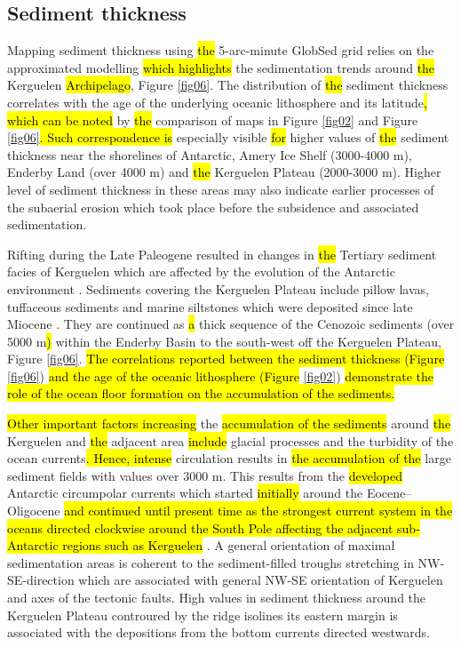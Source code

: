 \documentclass[geomatics,article,submit,pdftex,moreauthors]{Definitions/mdpi}
\begin{document}
\subsection{Sediment thickness}

Mapping sediment thickness using \hl{the }5-arc-minute GlobSed grid relies on the approximated modelling \hl{which highlights} the sedimentation trends around \hl{the }Kerguelen \hl{Archipelago}, Figure \ref{fig06}. The distribution of \hl{the }sediment thickness correlates with the age of the underlying oceanic lithosphere and its latitude\hl{, which can be noted} by \hl{the }comparison of maps in Figure \ref{fig02} and Figure \ref{fig06}\hl{. Such correspondence is }especially visible \hl{for} higher values of \hl{the }sediment thickness near the shorelines of Antarctic, Amery Ice Shelf (3000-4000 m), Enderby Land (over 4000 m) and \hl{the }Kerguelen Plateau (2000-3000 m). Higher level of sediment thickness in these areas may also indicate earlier processes of the subaerial erosion which took place before the subsidence and associated sedimentation. 

Rifting during the Late Paleogene resulted in changes in \hl{the }Tertiary sediment facies of Kerguelen which are affected by the evolution of the Antarctic environment \cite{Froehlich}. Sediments covering the Kerguelen Plateau include pillow lavas, tuffaceous sediments and marine siltstones which were deposited since late Miocene \cite{Duncan}. They are continued as \hl{a} thick sequence of the Cenozoic sediments (over 5000 m\hl{)} within the Enderby Basin to the south-west off the Kerguelen Plateau, Figure \ref{fig06}. \hl{The correlations reported between the sediment thickness (Figure} \ref{fig06}) \hl{and the age of the oceanic lithosphere (Figure} \ref{fig02}) \hl{demonstrate the role of the ocean floor formation on the accumulation of the sediments.} 

\hl{Other important factors increasing }the \hl{accumulation of the sediments} around \hl{the }Kerguelen and \hl{the }adjacent area \hl{include }glacial processes and the turbidity of the ocean currents\hl{. Hence, intense} circulation results in \hl{the accumulation of the }large sediment fields with values over 3000 m. This results from the \hl{developed} Antarctic circumpolar currents which started \hl{initially }around the Eocene--Oligocene \hl{and continued until present time as the strongest current system in the oceans directed clockwise around the South Pole affecting the adjacent sub-Antarctic regions such as Kerguelen }\cite{Huang,ROBERT200237}. A general orientation of maximal sedimentation areas is coherent to the sediment-filled troughs stretching in NW-SE-direction which are associated with general NW-SE orientation of Kerguelen and axes of the tectonic faults. High values in sediment thickness around the Kerguelen Plateau controured by the ridge isolines its eastern margin is associated with the depositions from the bottom currents directed westwards.
\end{document}
